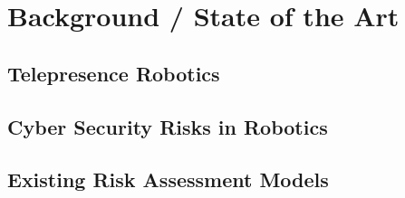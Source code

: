 
\newpage
\section{Background / State of the Art}


\subsection{Telepresence Robotics}


\subsection{Cyber Security Risks in Robotics}


\subsection{Existing Risk Assessment Models}


